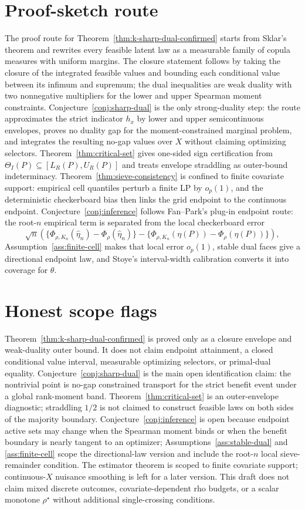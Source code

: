 \documentclass[11pt]{article}
\theoremstyle{definition}
\theoremstyle{plain}
\theoremstyle{remark}
\begin{document}
\section{Proof-sketch route}
The proof route for Theorem~\ref{thm:k-sharp-dual-confirmed} starts from Sklar's theorem and rewrites every feasible latent law as a measurable family of copula measures with uniform margins.  The closure statement follows by taking the closure of the integrated feasible values and bounding each conditional value between its infimum and supremum; the dual inequalities are weak duality with two nonnegative multipliers for the lower and upper Spearman moment constraints.  Conjecture~\ref{conj:sharp-dual} is the only strong-duality step: the route approximates the strict indicator \(h_x\) by lower and upper semicontinuous envelopes, proves no duality gap for the moment-constrained marginal problem, and integrates the resulting no-gap values over \(X\) without claiming optimizing selectors.  Theorem~\ref{thm:critical-set} gives one-sided sign certification from \(\Theta_I(P)\subseteq[L_R(P),U_R(P)]\) and treats envelope straddling as outer-bound indeterminacy.  Theorem~\ref{thm:sieve-consistency} is confined to finite covariate support: empirical cell quantiles perturb a finite LP by \(o_p(1)\), and the deterministic checkerboard bias then links the grid endpoint to the continuous endpoint.  Conjecture~\ref{conj:inference} follows Fan--Park's plug-in endpoint route: the root-\(n\) empirical term is separated from the local checkerboard error
\[
\sqrt n\left(\{\Phi_{\rho,K_n}(\widehat\eta_n)-\Phi_\rho(\widehat\eta_n)\}
-\{\Phi_{\rho,K_n}(\eta(P))-\Phi_\rho(\eta(P))\}\right),
\]
Assumption~\ref{ass:finite-cell} makes that local error \(o_p(1)\), stable dual faces give a directional endpoint law, and Stoye's interval-width calibration converts it into coverage for \(\theta\).

\section{Honest scope flags}
Theorem~\ref{thm:k-sharp-dual-confirmed} is proved only as a closure envelope and weak-duality outer bound.  It does not claim endpoint attainment, a closed conditional value interval, measurable optimizing selectors, or primal-dual equality.  Conjecture~\ref{conj:sharp-dual} is the main open identification claim: the nontrivial point is no-gap constrained transport for the strict benefit event under a global rank-moment band.  Theorem~\ref{thm:critical-set} is an outer-envelope diagnostic; straddling \(1/2\) is not claimed to construct feasible laws on both sides of the majority boundary.  Conjecture~\ref{conj:inference} is open because endpoint active sets may change when the Spearman moment binds or when the benefit boundary is nearly tangent to an optimizer; Assumptions~\ref{ass:stable-dual} and \ref{ass:finite-cell} scope the directional-law version and include the root-\(n\) local sieve-remainder condition.  The estimator theorem is scoped to finite covariate support; continuous-\(X\) nuisance smoothing is left for a later version.  This draft does not claim mixed discrete outcomes, covariate-dependent rho budgets, or a scalar monotone \(\rho^\star\) without additional single-crossing conditions.
\end{document}
